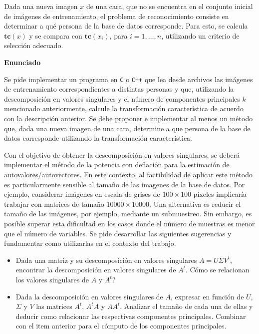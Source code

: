 \documentclass[11pt, a4paper]{article}
\begin{document}
Dada una nueva imagen $x$ de una cara, que no se encuentra en el conjunto inicial de im\'agenes de entrenamiento, el
problema de reconocimiento consiste en determinar a qu\'e persona de la base de datos corresponde. Para esto, se calcula
$\mathbf{tc}(x)$ y se compara con $\mathbf{tc}(x_i)$, para $i = 1,\ldots, n$, utilizando un criterio de selecci\'on
adecuado.


{\bf\noindent Enunciado}

Se pide implementar un programa en \verb+C+ o \verb-C++- que lea desde archivos las im\'agenes de entrenamiento correspondientes a distintas
personas y que, utilizando la descomposici\'on en valores singulares y el n\'umero de componentes principales $k$
mencionado anteriormente, calcule la transformaci\'on caracter\'istica de acuerdo con la descripci\'on anterior. Se debe
proponer e implementar al menos un m\'etodo que, dada una nueva imagen de una cara, determine a que persona de la base
de datos corresponde utilizando la transformaci\'on caracter\'istica.

Con el objetivo de obtener la descomposici\'on en valores singulares, se deber\'a implementar el m\'etodo de la potencia
con deflaci\'on para la estimaci\'on de autovalores/autovectores. En este contexto, al factibilidad de aplicar este
m\'etodo es particularmente sensible al tama\~no de las imagenes de la base de datos. Por ejemplo, considerar im\'agenes
en escala de grises de $100 \times 100$ p\'ixeles implicar\'ia trabajar con matrices de tama\~no $10000 \times
10000$. Una alternativa es reducir el tama\~no de las im\'agenes, por ejemplo, mediante un submuestreo. 
Sin embargo, es posible superar esta dificultad en los casos donde el n\'umero de muestras es menor que el
n\'umero de variables. Se pide desarrollar las siguientes sugerencias y fundamentar como utilizarlas en el contexto del
trabajo.

\begin{itemize}
\item Dada una matriz y su descomposici\'on en valores singulares $A = U \Sigma V^t$, encontrar la descomposici\'on en
valores singulares de $A^t$. C\'omo se relacionan los valores singulares de $A$ y $A^t$?
\item Dada la descomposici\'on en valores singulares de $A$, expresar en funci\'on de $U$, $\Sigma$ y $V$ las matrices
$A^t$, $A^tA$ y $AA^t$. Analizar el tama\~no de cada una de ellas y deducir como relacionar las respectivas componentes
principales.
Combinar con el item anterior para el c\'omputo de los componentes principales.
\end{itemize}
\end{document}
